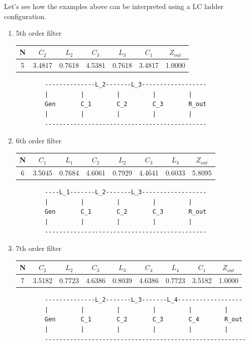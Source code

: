 \documentclass[a4paper,12pt]{report}
\begin{document}
Let's see how the examples above can be interpreted using a LC ladder configuration.

\begin{enumerate}
	\item 5th order filter
	
	\begin{tabular}{||c c c c c c c ||} 
		\hline
		N & $C_2$  & $L_2$  & $C_3$  & $L_3$  & $C_1$  & $Z_{out}$\\ [0.5ex] 
		\hline
		5  & 3.4817 & 0.7618 & 4.5381 & 0.7618 & 3.4817 & 1.0000\\ 
		\hline
	\end{tabular}

	\begin{verbatim}
		--------------L_2-------L_3------------------
		|         |         |         |         |
		Gen       C_1       C_2       C_3       R_out
		|         |         |         |         |
		---------------------------------------------
	\end{verbatim}
	
	\item 6th order filter
	
	\begin{tabular}{||c c c c c c c c||} 
		\hline
		N & $C_1$  & $L_1$  & $C_2$  & $L_2$  & $C_3$ & $L_3 $ &$Z_{out}$\\ 	[0.5ex] 
		\hline
	 	6  & 3.5045 & 0.7684 & 4.6061 & 0.7929 & 4.4641 & 0.6033 & 5.8095\\ 
		\hline
	\end{tabular}

	\begin{verbatim}
		----L_1-------L_2-------L_3------------------
		|         |         |         |         |
		Gen       C_1       C_2       C_3       R_out
		|         |         |         |         |
		---------------------------------------------
	\end{verbatim}
		\item 7th order filter
	
		\begin{tabular}{||c c c c c c c c c ||} 
			\hline
			N & $C_2$  & $L_2$  & $C_3$  & $L_3$  & $C_4$  & $L_4$  & $C_1$  & $Z_{out}$\\ [0.5ex] 
			\hline
			7  & 3.5182 & 0.7723 & 4.6386 & 0.8039 & 4.6386 & 0.7723 & 3.5182 & 1.0000\\ 
			\hline
		\end{tabular}

	\begin{verbatim}
		--------------L_2-------L_3-------L_4------------------
		|         |         |         |         |         |
		Gen       C_1       C_2       C_3       C_4       R_out
		|         |         |         |         |         |
		--------------------------------------------------------
	\end{verbatim}
\end{enumerate}
\end{document}
